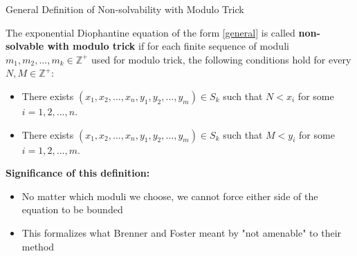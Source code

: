 ﻿\documentclass[10pt,aspectratio=169]{beamer}
\begin{document}
\begin{frame}{General Definition of Non-solvability with Modulo Trick}
    \begin{definition}
        The exponential Diophantine equation of the form \eqref{general} is called \textbf{non-solvable with modulo trick} if for each finite sequence of moduli $m_1, m_2, ..., m_k \in \mathbb{Z}^{+}$ used for modulo trick, the following conditions hold for every $N, M \in \mathbb{Z}^{+}$:
        
        \begin{itemize}
            \item There exists $(x_1, x_2, ..., x_n, y_1, y_2, ..., y_m) \in S_k$ such that $N < x_i$ for some $i = 1,2,...,n$.
            
            \item There exists $(x_1, x_2, ..., x_n, y_1, y_2, ..., y_m) \in S_k$ such that $M < y_i$ for some $i = 1,2,...,m$.
        \end{itemize}
    \end{definition}
    
    \textbf{Significance of this definition:}
    \begin{itemize}
        \item No matter which moduli we choose, we cannot force either side of the equation to be bounded
       
        \item This formalizes what Brenner and Foster meant by "not amenable" to their method
    \end{itemize}
\end{frame}
\end{document}
